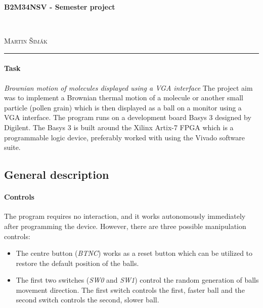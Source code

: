 \documentclass[11pt,a4paper]{article}
\begin{document}

    \begin{center}
        {\LARGE\textbf{B2M34NSV - Semester project}}\\[3mm]
        \begin{minipage}{0.4\textwidth}
            \begin{flushleft}
                \textsc{}
            \end{flushleft}
        \end{minipage}
        ~
        \begin{minipage}{0.4\textwidth}
            \begin{flushright}
                \textsc{Martin Šimák}
            \end{flushright}
        \end{minipage}
        \noindent\rule{14.5cm}{0.4pt}
    \end{center}

    \paragraph{Task} \emph{Brownian motion of molecules displayed using a VGA interface}
    The project aim was to implement a Brownian thermal motion of a molecule or another small particle (pollen grain) which is then displayed as a ball on a monitor using a VGA interface. The program runs on a development board Basys 3 designed by Digilent. The Basys 3 is built around the Xilinx Artix-7 FPGA which is a programmable logic device, preferably worked with using the Vivado software suite.

    \subsection*{General description}
        \paragraph{Controls} The program requires no interaction, and it works autonomously immediately after programming the device. However, there are three possible manipulation controls:
        \begin{itemize}
            \item The centre button (\emph{BTNC}) works as a reset button which can be utilized to restore the default position of the balls.
            \item The first two switches (\emph{SW0} and \emph{SW1}) control the random generation of balls movement direction. The first switch controls the first, faster ball and the second switch controls the second, slower ball.
        \end{itemize}
\end{document}
